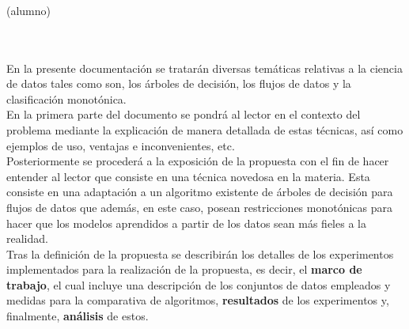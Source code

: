 \chapter*{}






\cleardoublepage
\thispagestyle{empty}

\begin{center}
{\large\bfseries \myTitle}\\
\end{center}
\begin{center}
\myName(alumno)\\
\end{center}

\\

\vspace{0.7cm}
\\

En la presente documentación se tratarán diversas temáticas relativas a la ciencia de datos tales como son, los árboles de decisión, los flujos de datos y la clasificación monotónica.\\

 En la primera parte del documento se pondrá al lector en el contexto del problema mediante la explicación de manera detallada de estas técnicas, así como ejemplos de uso, ventajas e inconvenientes, etc.\\
 
  Posteriormente se procederá a la exposición de la propuesta con el fin de hacer entender al lector que consiste en una técnica novedosa en la materia. Esta consiste en una adaptación a un algoritmo existente de árboles de decisión para flujos de datos que además, en este caso, posean restricciones monotónicas para hacer que los modelos aprendidos a partir de los datos sean más fieles a la realidad.\\
  
 Tras la definición de la propuesta se describirán los detalles de los experimentos implementados para la realización de la propuesta, es decir, el \textbf{marco de trabajo}, el cual incluye una descripción de los conjuntos de datos empleados y medidas para la comparativa de algoritmos, \textbf{resultados} de los experimentos y, finalmente, \textbf{análisis} de estos.

